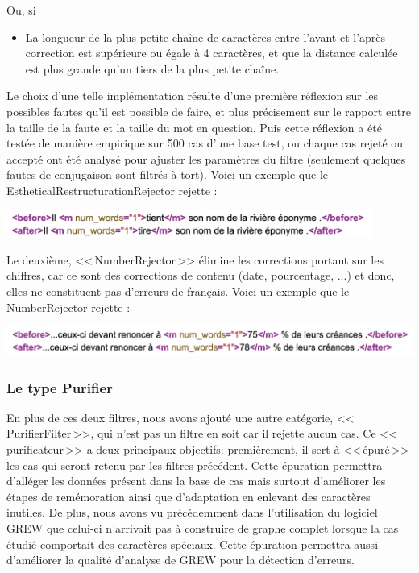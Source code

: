\documentclass[11pt]{article}
\begin{document}
Ou, si
\begin{itemize}
\item La longueur de la plus petite cha\^{i}ne de caract\`{e}res entre l'avant et l'apr\`{e}s correction est sup\'{e}rieure ou \'{e}gale \`{a} 4 caract\`{e}res, et que la distance calcul\'{e}e est plus grande qu'un tiers de la plus petite cha\^{i}ne.
\end{itemize}
 Le choix d'une telle impl\'{e}mentation r\'{e}sulte d'une premi\`{e}re r\'{e}flexion sur les possibles fautes qu'il est possible de faire, et plus pr\'{e}cisement sur le rapport entre la taille de la faute et la taille du mot en question. Puis cette r\'{e}flexion a \'{e}t\'{e} test\'{e}e de mani\`{e}re empirique sur 500 cas d'une base test, ou chaque cas rejet\'{e} ou accept\'{e} ont \'{e}t\'{e} analys\'{e} pour ajuster les param\`{e}tres du filtre (seulement quelques fautes de conjugaison sont filtr\'{e}s \`{a} tort).
 Voici un exemple que le EstheticalRestructurationRejector rejette :

\begin{center}
\includegraphics[width=12cm]{exemple12.png} %
\end{center}
Le deuxi\`{e}me, <<\,NumberRejector\,>> \'{e}limine les corrections portant sur les chiffres, car ce sont des corrections de contenu (date, pourcentage, ...) et donc, elles ne constituent pas d'erreurs de fran\c{c}ais. 
Voici un exemple que le NumberRejector rejette :
\begin{center}
\includegraphics[width=14cm]{exemple13.png} %
\end{center}

\subsubsection{Le type Purifier}
En plus de ces deux filtres, nous avons ajout\'{e} une autre cat\'{e}gorie, <<\,PurifierFilter\,>>, qui n'est pas un filtre en soit car il rejette aucun cas. Ce <<\,purificateur\,>> a deux principaux objectifs: premi\`{e}rement, il sert \`{a} <<\,\'{e}pur\'{e}\,>> les cas qui seront retenu par les filtres pr\'{e}c\'{e}dent. Cette \'{e}puration permettra d'all\'{e}ger les donn\'{e}es pr\'{e}sent dans la base de cas mais surtout d'am\'{e}liorer les \'{e}tapes de rem\'{e}moration ainsi que d'adaptation en enlevant des caract\`{e}res inutiles. De plus, nous avons vu pr\'{e}c\'{e}demment dans l'utilisation du logiciel GREW que celui-ci n'arrivait pas \`{a} construire de graphe complet lorsque la cas \'{e}tudi\'{e} comportait des caract\`{e}res sp\'{e}ciaux. Cette \'{e}puration permettra aussi d'am\'{e}liorer la qualit\'{e} d'analyse de GREW pour la d\'{e}tection d'erreurs.
\end{document}
